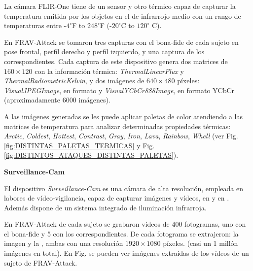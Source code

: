 La cámara \gls{FLIR}-One \cite{FLIROnline} tiene de un sensor  y otro térmico capaz de capturar la temperatura emitida por los objetos en el de infrarrojo medio con un rango de temperaturas entre -$4^{\circ}$F to $248^{\circ}$F (-$20^{\circ}$C to $120^{\circ}$ C). 

En \Gls{FRAV-Attack} se tomaron tres capturas con el \gls{bona-fide} de cada sujeto en pose frontal, perfil derecho y perfil izquierdo, y una captura de los  correspondientes. Cada captura de este dispositivo genera dos matrices de $160\times120$ con la información térmica: \textit{ThermalLinearFlux} y \textit{ThermalRadiometricKelvin}, y dos imágenes  de $640\times480$ píxeles: \textit{VisualJPEGImage}, en formato  y \textit{VisualYCbCr888Image}, en formato \Gls{YCbCr} (aproximadamente $6000$ imágenes).  

A las imágenes generadas se les puede aplicar paletas de color atendiendo a las matrices de temperatura para analizar determinadas propiedades térmicas: \textit{Arctic}, \textit{Coldest}, \textit{Hottest}, \textit{Contrast}, \textit{Gray}, \textit{Iron}, \textit{Lava}, \textit{Rainbow}, \textit{Whell} (ver Fig.\ref{fig:DISTINTAS_PALETAS_TERMICAS} y Fig. \ref{fig:DISTINTOS_ATAQUES_DISTINTAS_PALETAS}).

\medskip
\textbf{Surveillance-Cam}


El dispositivo \textit{Surveillance-Cam} es una cámara de alta resolución, empleada en labores de vídeo-vigilancia, capaz de capturar imágenes y vídeos, en y en . Además dispone de un sistema integrado de iluminación infrarroja.

En \Gls{FRAV-Attack} de cada sujeto se grabaron vídeos de $400$ fotogramas, uno con el \gls{bona-fide} y 5 con los  correspondientes. De cada fotograma se extrajeron: la imagen  y la , ambas con una resolución $1920\times1080$ píxeles. (casi un 1 millón imágenes en total). En Fig.  se pueden ver imágenes extraídas de los vídeos de un sujeto de \Gls{FRAV-Attack}.


